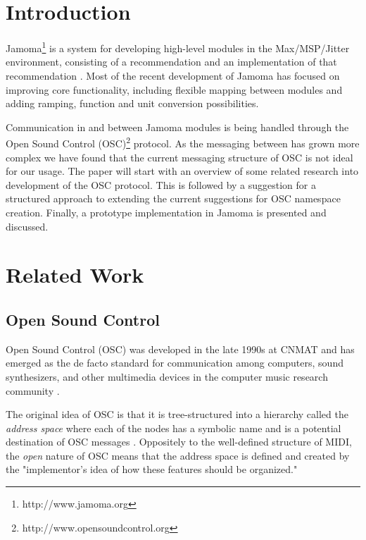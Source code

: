 \documentclass{sig-alternate}
\begin{document}


\section{Introduction}

Jamoma\footnote{http://www.jamoma.org} is a system for developing high-level modules in the Max/MSP/Jitter environment, consisting of a recommendation and an implementation of that recommendation  \cite{Place:2006}. Most of the recent development of Jamoma has focused on improving core functionality, including flexible mapping between modules and adding ramping, function and unit conversion possibilities. 

Communication in and between Jamoma modules is being handled through the Open Sound Control (OSC)\footnote{http://www.opensoundcontrol.org} protocol. As the messaging between has grown more complex we have found that the current messaging structure of OSC is not ideal for our usage. The paper will start with an overview of some related research into development of the OSC protocol. This is followed by a suggestion for a structured approach to extending the current suggestions for OSC namespace creation. Finally, a prototype implementation in Jamoma is presented and discussed.


\section{Related Work}


\subsection{Open Sound Control}

Open Sound Control (OSC) was developed in the late 1990s at CNMAT and has emerged as the de facto standard for communication among computers, sound synthesizers, and other multimedia devices in the computer music research community \cite{Wright:2003}. 


The original idea of OSC is that it is tree-structured into a hierarchy called the \emph{address space} where each of the nodes has a symbolic name and is a potential destination of OSC messages \cite{Wright:2003}. Oppositely to the well-defined structure of MIDI, the \emph{open} nature of OSC means that the address space is defined and created by the "implementor’s idea of how these features should be organized." 
\end{document}
